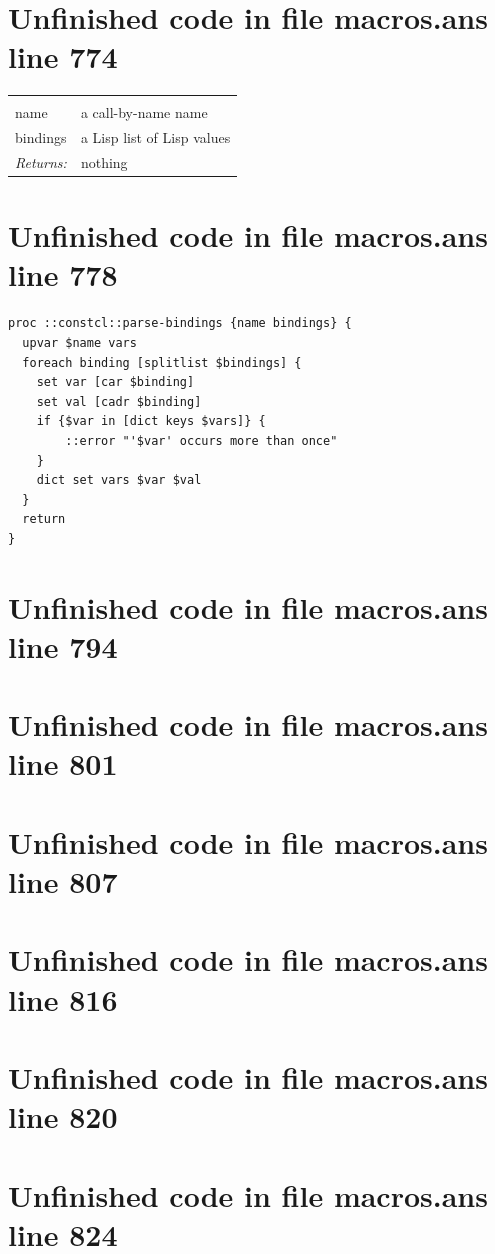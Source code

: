 \documentclass[twoside,9pt]{report}
\begin{document}
\section{Unfinished code in file macros.ans line 774}
\noindent\begin{tabular}{ |p{1.9cm} p{8cm}| }
\hline
\rowcolor[HTML]{CCCCCC} \multicolumn{2}{|l|}{\bf parse-bindings (internal)} \\
name & a call-by-name name \\
bindings & a Lisp list of Lisp values \\
\textit{Returns:} & nothing \\
\hline
\end{tabular}
\section{Unfinished code in file macros.ans line 778}
\begin{lstlisting}
proc ::constcl::parse-bindings {name bindings} {
  upvar $name vars
  foreach binding [splitlist $bindings] {
    set var [car $binding]
    set val [cadr $binding]
    if {$var in [dict keys $vars]} {
        ::error "'$var' occurs more than once"
    }
    dict set vars $var $val
  }
  return
}
\end{lstlisting}
\section{Unfinished code in file macros.ans line 794}
\section{Unfinished code in file macros.ans line 801}
\section{Unfinished code in file macros.ans line 807}
\section{Unfinished code in file macros.ans line 816}
\section{Unfinished code in file macros.ans line 820}
\section{Unfinished code in file macros.ans line 824}
\end{document}

